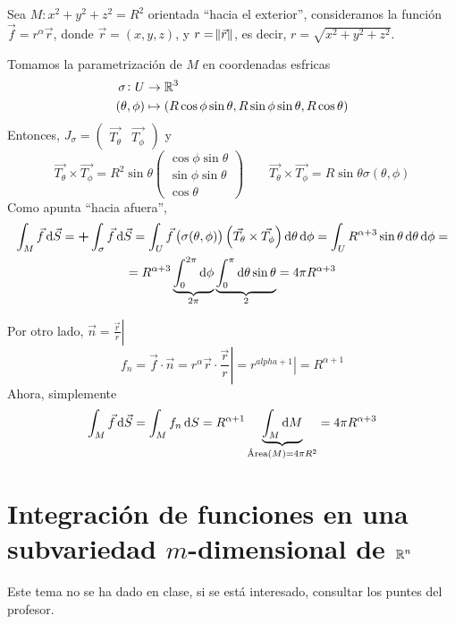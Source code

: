 \begin{example*}
    Sea $M : x^2 + y^2 + z^2 = R^2$ orientada ``hacia el exterior'', consideramos la función $\vec{f} = r^\alpha \vec{r}$, donde
    $\vec{r} = (x,y,z)$, y $r = \norm{\vec{r}}$, es decir, $r = \sqrt{x^2 + y^2 + z^2}$.

    Tomamos la parametrización de $M$ en coordenadas esfricas
    \[
        \begin{aligned}
            \sigma \colon U &\to \mathbb{R}^3 \\
            (\theta, \phi) &\mapsto \left( R \cos \phi \sin \theta, R\sin \phi \sin \theta, R\cos \theta \right)
        \end{aligned}
    \]
    Entonces, $J_\sigma = \begin{pmatrix} \vec{T_\theta} & \vec{T_\phi} \end{pmatrix}$ y
    \[
        \vec{T_\theta} \times \vec{T_\phi} = R^2 \sin\theta
        \begin{pmatrix}
            \cos\phi\sin\theta \\ \sin\phi\sin\theta \\ \cos\theta
        \end{pmatrix} \qquad
        \vec{T_\theta} \times \vec{T_\phi} = R \sin\theta \sigma(\theta, \phi)
    \]
    Como apunta ``hacia afuera'', 
    \begin{gather*}
        \int_M \vec{f} \dif \vec{S} = \textbf{+} \int_\sigma \vec{f} \dif \vec{S} = 
        \int_U \vec{f} \left( \sigma(\theta, \phi)\right) \left( \vec{T_\theta} \times \vec{T_\phi} \right) \dif \theta \dif \phi =
        \int_U R^{\alpha+3} \sin \theta \dif \theta \dif \phi =\\= R^{\alpha+3} \underbrace{\int^{2\pi}_0 \dif \phi}_{2\pi}
        \underbrace{ \int^\pi_0 \dif \theta \sin \theta }_{2} = 4\pi R^{\alpha+3}
    \end{gather*}

    Por otro lado, $\vec{n} = \left. \frac{\vec{r}}{r} \right\vert$
    \[
        f_n = \vec{f} \cdot \vec{n} = r^{\alpha} \vec{r} \cdot \left.\frac{\vec{r}}{r}\right\vert = \left. r^{alpha+1}\right\vert = R^{\alpha+1}
    \]
    Ahora, simplemente
    \[
        \int_M \vec{f} \dif \vec{S} = \int_M f_n \dif S = R^{\alpha+1} \underbrace{\int_M \dif M}_{\text{Área}(M) = 4\pi R^2} = 4\pi R^{\alpha+3}
    \]
\end{example*}

\section{Integración de funciones en una subvariedad $m$-dimensional de $\mathbb{R}^n$}

Este tema no se ha dado en clase, si se está interesado, consultar los puntes del profesor.
